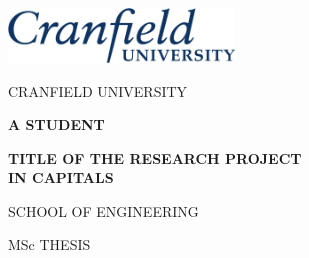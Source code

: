 



\thispagestyle{empty}

\Large \begin{center}


\begin{flushright}
    \includegraphics[width=6.0cm]{figures/logos_Cranfield/Cranfield_logo_blue}
\end{flushright}

\vspace{10mm}

CRANFIELD UNIVERSITY

\vspace{40mm}

\LARGE \textbf{A STUDENT}

\vspace{25mm}

\textbf{TITLE OF THE RESEARCH PROJECT \\
IN CAPITALS}

\vspace{55mm}

\Large SCHOOL OF ENGINEERING

\vspace{20mm}

MSc THESIS

\end{center} \normalsize

\pagebreak


\thispagestyle{empty}

\mbox

\pagebreak


